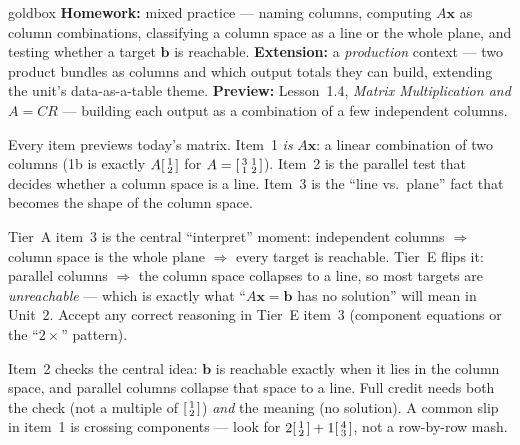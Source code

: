 \documentclass[10pt]{article}
\newcommand{\xx}{\mathbf{x}}
\newcommand{\bb}{\mathbf{b}}
\begin{document}
\begin{skillbox}{goldbox}
\textbf{Homework:} mixed practice --- naming columns, computing $A\xx$ as column combinations,
classifying a column space as a line or the whole plane, and testing whether a target $\bb$ is
reachable. \textbf{Extension:} a \emph{production} context --- two product bundles as columns and
which output totals they can build, extending the unit's data-as-a-table theme. \textbf{Preview:}
Lesson~1.4, \emph{Matrix Multiplication and $A=CR$} --- building each output as a combination of a
few independent columns.
\end{skillbox}

\begin{teachernote}[Warm-Up]
Every item previews today's matrix. Item~1 \emph{is} $A\xx$: a linear combination of two columns
(1b is exactly $A\begin{bsmallmatrix} 1\\2 \end{bsmallmatrix}$ for $A=\begin{bsmallmatrix} 3&1\\1&2 \end{bsmallmatrix}$).
Item~2 is the parallel test that decides whether a column space is a line. Item~3 is the ``line
vs.\ plane'' fact that becomes the shape of the column space.
\end{teachernote}

\begin{teachernote}
Tier~A item~3 is the central ``interpret'' moment: independent columns $\Rightarrow$ column space
is the whole plane $\Rightarrow$ every target is reachable. Tier~E flips it: parallel columns
$\Rightarrow$ the column space collapses to a line, so most targets are \emph{unreachable} ---
which is exactly what ``$A\xx=\bb$ has no solution'' will mean in Unit~2. Accept any correct
reasoning in Tier~E item~3 (component equations or the ``$2\times$'' pattern).
\end{teachernote}

\begin{teachernote}
Item~2 checks the central idea: $\bb$ is reachable exactly when it lies in the column space, and
parallel columns collapse that space to a line. Full credit needs both the check (not a multiple
of $\begin{bsmallmatrix} 1\\2 \end{bsmallmatrix}$) \emph{and} the meaning (no solution). A common
slip in item~1 is crossing components --- look for $2\begin{bsmallmatrix} 1\\2 \end{bsmallmatrix}+1\begin{bsmallmatrix} 4\\3 \end{bsmallmatrix}$, not a row-by-row mash.
\end{teachernote}
\end{document}
